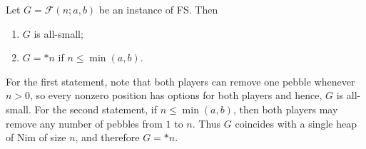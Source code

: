 \documentclass[oneside,reqno]{amsart}
\newcommand{\fs}{\mathcal{F}}
\newcommand{\pp}{\mathscr{P}}
\begin{document}
\begin{observation}\label{obs: fs positions for small n}
    Let $G=\fs(n;a,b)$ be an instance of {\sc FS}. Then 
    \begin{enumerate}
        \item $G$ is all-small;
        \item $G=*n$ if $n\le \min(a,b)$.
    \end{enumerate}


    For the first statement, note that both players can remove one pebble whenever $n>0$, so every nonzero position has options for both players and hence, $G$ is all-small. For the second statement, if $n\le \min(a,b)$, then both players may remove any number of pebbles from $1$ to $n$. Thus $G$ coincides with a single heap of {\sc Nim} of size $n$, and therefore $G=*n$.

    \end{observation}




\end{document}

